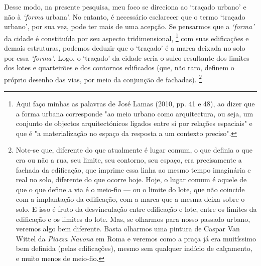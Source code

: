 \documentclass[12pt, a4paper]{book} %
\begin{document}
            Desse modo, na presente pesquisa, meu foco se direciona ao `traçado urbano' e não à \textit{`forma} urbana'. No entanto, é necessário esclarecer que o termo `traçado urbano', por sua vez, pode ter mais de uma acepção. Se pensarmos que a \textit{`forma'} da cidade é constituída por seu aspecto tridimensional,
                \footnote[6]{Aqui faço minhas as palavras de José Lamas (2010, pp. 41 e 48), ao dizer que a forma urbana corresponde "ao meio urbano como arquitectura, ou seja, um conjunto de objectos arquitectónicos ligados entre si por relações espaciais" e que é "a materialização no espaço da resposta a um contexto preciso".} 
            com suas edificações e demais estruturas, podemos deduzir que o `traçado' é a marca deixada no solo por essa \textit{`forma'}. Logo, o `traçado' da cidade seria o sulco resultante dos limites dos lotes e quarteirões e dos contornos edificados (que, não raro, definem o próprio desenho das vias, por meio da conjunção de fachadas).
                \footnote[7]{Note-se que, diferente do que atualmente é lugar comum, o que definia o que era ou não a rua, seu limite, seu contorno, seu espaço, era precisamente a fachada da edificação, que imprime essa linha ao mesmo tempo imaginária e real no solo, diferente do que ocorre hoje. Hoje, o lugar comum é aquele de que o que define a via é o meio-fio — ou o limite do lote, que não coincide com a implantação da edificação, com a marca que a mesma deixa sobre o solo. E isso é fruto da desvinculação entre edificação e lote, entre os limites da edificação e os limites do lote. Mas, se olharmos para nosso passado urbano, veremos algo bem diferente. Basta olharmos uma pintura de Caspar Van Wittel da \textit{Piazza Navona} em Roma e veremos como a praça já era muitíssimo bem definida (pelas edificações), mesmo sem qualquer indício de calçamento, e muito menos de meio-fio.} 
\end{document}
